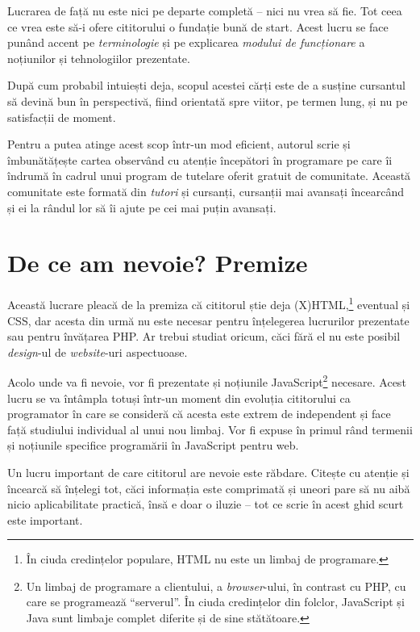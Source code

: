 Lucrarea de față nu este nici pe departe completă -- nici nu vrea să fie.  Tot
ceea ce vrea este să-i ofere cititorului o fundație bună de start. Acest lucru
se face punând accent pe \textit{terminologie} și pe explicarea \textit{modului
de funcționare} a noțiunilor și tehnologiilor prezentate.

După cum probabil intuiești deja, scopul acestei cărți este de a susține
cursantul să devină bun în perspectivă, fiind orientată spre viitor, pe termen
lung, și nu pe satisfacții de moment.

Pentru a putea atinge acest scop într-un mod eficient, autorul scrie și
îmbunătățește cartea observând cu atenție începători în programare pe care îi
îndrumă în cadrul unui program de tutelare oferit gratuit de comunitate.
Această comunitate este formată din \textit{tutori} și cursanți, cursanții mai
avansați încearcând și ei la rândul lor să îi ajute pe cei mai puțin avansați.

\section*{De ce am nevoie? Premize}
{}

Această lucrare pleacă de la premiza că cititorul știe deja
(X)HTML,\footnote{În ciuda credințelor populare, HTML nu este un limbaj de
programare.} eventual și CSS, dar acesta din urmă nu este necesar pentru
înțelegerea lucrurilor prezentate sau pentru învățarea PHP. Ar trebui studiat
oricum, căci fără el nu este posibil \textsl{design}-ul de \textsl{website}-uri
aspectuoase.

Acolo unde va fi nevoie, vor fi prezentate și noțiunile JavaScript\footnote{Un
limbaj de programare a clientului, a \textsl{browser}-ului, în contrast cu PHP,
cu care se programează ``serverul''.  În ciuda credințelor din folclor,
JavaScript și Java sunt limbaje complet diferite și de sine stătătoare.}
necesare. Acest lucru se va întâmpla totuși într-un moment din evoluția
cititorului ca programator în care se consideră că acesta este extrem de
independent și face față studiului individual al unui nou limbaj. Vor fi expuse
în primul rând termenii și noțiunile specifice programării în JavaScript pentru
web.

Un lucru important de care cititorul are nevoie este răbdare. Citește cu
atenție și încearcă să înțelegi tot, căci informația este comprimată și uneori
pare să nu aibă nicio aplicabilitate practică, însă e doar o iluzie -- tot ce
scrie în acest ghid scurt este important.

